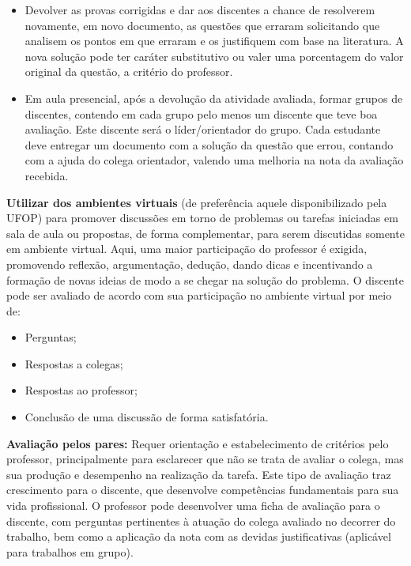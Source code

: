 \documentclass[
	12pt,				%
	openright,			%
	oneside,			%
	a4paper,			%
	english,			%
	brazil				%
	]{abntex2}
\begin{document}
\begin{itemize}
\item Devolver as provas corrigidas e dar aos discentes a chance de resolverem novamente, em novo documento, as questões que erraram solicitando que analisem os pontos em que erraram e os justifiquem com base na literatura. A nova solução pode ter caráter substitutivo ou valer uma porcentagem do valor original da questão, a critério do professor.

\item Em aula presencial, após a devolução da atividade avaliada, formar grupos de discentes, contendo em cada grupo pelo menos um discente que teve boa avaliação. Este discente será o líder/orientador do grupo. Cada estudante deve entregar um documento com a solução da questão que errou, contando com a ajuda do colega orientador, valendo uma melhoria na nota da avaliação recebida.

\end{itemize}

\noindent \textbf{Utilizar dos ambientes virtuais} (de preferência aquele disponibilizado pela UFOP) para promover discussões em torno de problemas ou tarefas iniciadas em sala de aula ou propostas, de forma complementar, para serem discutidas somente em ambiente virtual. Aqui, uma maior participação do professor é exigida, promovendo reflexão, argumentação, dedução, dando dicas e incentivando a formação de novas ideias de modo a se chegar na solução do problema. O discente pode ser avaliado de acordo com sua participação no ambiente virtual por meio de:
\begin{itemize}
    \item Perguntas;
    \item Respostas a colegas;
    \item Respostas ao professor;
    \item Conclusão de uma discussão de forma satisfatória.
\end{itemize}

\noindent \textbf{Avaliação pelos pares:} Requer orientação e estabelecimento de critérios pelo professor, principalmente para esclarecer que não se trata de avaliar o colega, mas sua produção e desempenho na realização da tarefa. Este tipo de avaliação traz crescimento para o discente, que desenvolve competências fundamentais para sua vida profissional. O professor pode desenvolver uma ficha de avaliação para o discente, com perguntas pertinentes à atuação do colega avaliado no decorrer do trabalho, bem como a aplicação da nota com as devidas justificativas (aplicável para trabalhos em grupo).
\end{document}
